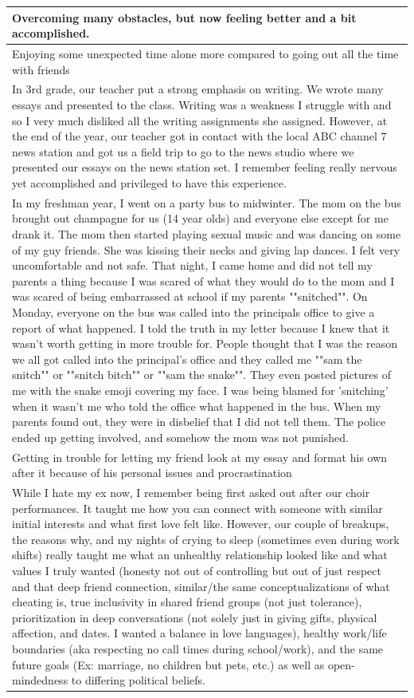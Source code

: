 \documentclass[
  .7em,
  letterpaper,
  DIV=11,
  numbers=noendperiod]{scrartcl}
\begin{document}
\begin{table}
\begin{tabular}{l}
\hline
Overcoming many obstacles, but now feeling better and a bit accomplished.\\
\hline
Enjoying some unexpected time alone more compared to going out all the time with friends\\
\hline
In 3rd grade, our teacher put a strong emphasis on writing. We wrote many essays and presented to the class. Writing was a weakness I struggle with and so I very much disliked all the writing assignments she assigned. However, at the end of the year, our teacher got in contact with the local ABC channel 7 news station and got us a field trip to go to the news studio where we presented our essays on the news station set. I remember feeling really nervous yet accomplished and privileged to have this experience.\\
\hline
In my freshman year, I went on a party bus to midwinter. The mom on the bus brought out champagne for us (14 year olds) and everyone else except for me drank it. The mom then started playing sexual music and was dancing on some of my guy friends. She was kissing their necks and giving lap dances. I felt very uncomfortable and not safe. That night, I came home and did not tell my parents a thing because I was scared of what they would do to the mom and I was scared of being embarrassed at school if my parents ""snitched"". On Monday, everyone on the bus was called into the principals office to give a report of what happened. I told the truth in my letter because I knew that it wasn't worth getting in more trouble for. People thought that I was the reason we all got called into the principal's office and they called me ""sam the snitch"" or ""snitch bitch"" or ""sam the snake"". They even posted pictures of me with the snake emoji covering my face. I was being blamed for 'snitching' when it wasn't me who told the office what happened in the bus. When my parents found out, they were in disbelief that I did not tell them. The police ended up getting involved, and somehow the mom was not punished.\\
\hline
Getting in trouble for letting my friend look at my essay and format his own after it because of his personal issues and procrastination\\
\hline
While I hate my ex now, I remember being first asked out after our choir performances. It taught me how you can connect with someone with similar initial interests and what first love felt like. However, our couple of breakups, the reasons why, and my nights of crying to sleep (sometimes even during work shifts) really taught me what an unhealthy relationship looked like and what values I truly wanted (honesty not out of controlling but out of just respect and that deep friend connection, similar/the same conceptualizations of what cheating is, true inclusivity in shared friend groups (not just tolerance), prioritization in deep conversations (not solely just in giving gifts, physical affection, and dates. I wanted a balance in love languages), healthy work/life boundaries (aka respecting no call times during school/work), and the same future goals (Ex: marriage, no children but pets, etc.) as well as open-mindedness to differing political beliefs.\\

\end{tabular}
\end{table}
\end{document}
